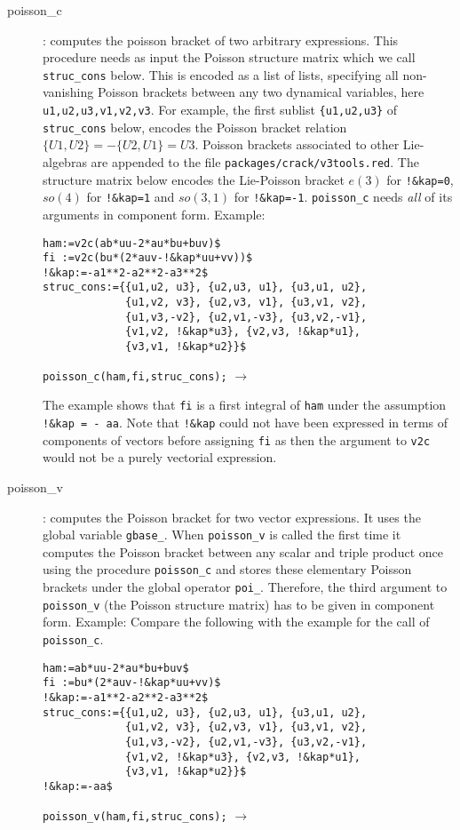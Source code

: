 \begin{description}
\item[poisson\_c] : computes the poisson bracket of two arbitrary
  expressions.  This procedure needs as input the Poisson structure
  matrix which we call \texttt{struc\_cons} below.  This is encoded as
  a list of lists, specifying all non-vanishing Poisson brackets
  between any two dynamical variables, here
  \texttt{u1,u2,u3,v1,v2,v3}.  For example, the first sublist
  \texttt{\{u1,u2,u3\}} of \texttt{struc\_cons} below, encodes the
  Poisson bracket relation $\{U1,U2\}=-\{U2,U1\}=U3$.  Poisson
  brackets associated to other Lie-algebras are appended to the file
  \texttt{packages/crack/v3tools.red}.  The structure matrix below
  encodes the Lie-Poisson bracket $e(3)$ for \texttt{!\&kap=0},
  $so(4)$ for \texttt{!\&kap=1} and $so(3,1)$ for \texttt{!\&kap=-1}.
  \texttt{poisson\_c} needs \emph{all} of its arguments in component
  form.  Example:
\begin{verbatim}
ham:=v2c(ab*uu-2*au*bu+buv)$
fi :=v2c(bu*(2*auv-!&kap*uu+vv))$
!&kap:=-a1**2-a2**2-a3**2$
struc_cons:={{u1,u2, u3}, {u2,u3, u1}, {u3,u1, u2},
             {u1,v2, v3}, {u2,v3, v1}, {u3,v1, v2},
             {u1,v3,-v2}, {u2,v1,-v3}, {u3,v2,-v1},
             {v1,v2, !&kap*u3}, {v2,v3, !&kap*u1},
             {v3,v1, !&kap*u2}}$
\end{verbatim}
\verb|poisson_c(ham,fi,struc_cons);| \quad $\longrightarrow$ 

The example shows that \texttt{fi} is a first integral of \texttt{ham}
under the assumption \texttt{!\&kap = - aa}.  Note that
\texttt{!\&kap} could not have been expressed in terms of components
of vectors before assigning \texttt{fi} as then the argument to
\texttt{v2c} would not be a purely vectorial expression.

\item[poisson\_v] : computes the Poisson bracket for two vector
  expressions.  It uses the global variable \texttt{gbase\_}.  When
  \texttt{poisson\_v} is called the first time it computes the Poisson
  bracket between any scalar and triple product once using the
  procedure \texttt{poisson\_c} and stores these elementary Poisson
  brackets under the global operator \texttt{poi\_}.  Therefore, the
  third argument to \texttt{poisson\_v} (the Poisson structure matrix)
  has to be given in component form.  Example: Compare the following
  with the example for the call of \texttt{poisson\_c}.
\begin{verbatim}
ham:=ab*uu-2*au*bu+buv$
fi :=bu*(2*auv-!&kap*uu+vv)$
!&kap:=-a1**2-a2**2-a3**2$
struc_cons:={{u1,u2, u3}, {u2,u3, u1}, {u3,u1, u2},
             {u1,v2, v3}, {u2,v3, v1}, {u3,v1, v2},
             {u1,v3,-v2}, {u2,v1,-v3}, {u3,v2,-v1},
             {v1,v2, !&kap*u3}, {v2,v3, !&kap*u1},
             {v3,v1, !&kap*u2}}$
!&kap:=-aa$
\end{verbatim}
\verb|poisson_v(ham,fi,struc_cons);| \quad $\longrightarrow$ 


\end{description}
